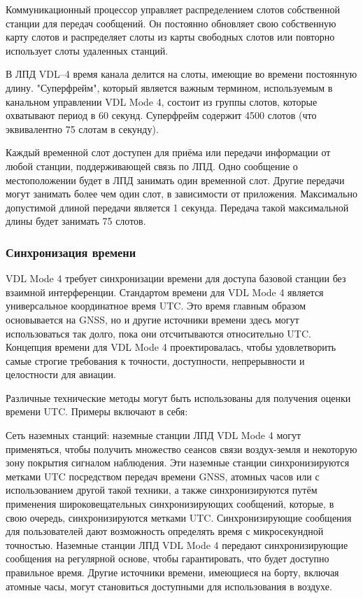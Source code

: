 \documentclass[a4paper,12pt]{report} %
\begin{document}
Коммуникационный процессор управляет распределением слотов собственной станции
для передач сообщений. Он постоянно обновляет свою собственную карту слотов и
распределяет слоты из карты свободных слотов или повторно использует слоты
удаленных станций.

В ЛПД VDL--4 время канала делится на слоты, имеющие во времени постоянную длину.
"Суперфрейм", который является важным термином, используемым в канальном
управлении VDL Mode 4, состоит из группы слотов, которые охватывают период в 60
секунд. Суперфрейм содержит 4500 слотов (что эквивалентно 75 слотам в секунду).

Каждый временной слот доступен для приёма или передачи информации от любой
станции, поддерживающей связь по ЛПД. Одно сообщение о местоположении будет в
ЛПД занимать один временной слот. Другие передачи могут занимать более чем один
слот, в зависимости от приложения. Максимально допустимой длиной передачи
является 1 секунда. Передача такой максимальной длины будет занимать 75 слотов. 

\subsubsection{Синхронизация времени}

VDL Mode 4 требует синхронизации времени для доступа базовой станции без
взаимной интерференции. Стандартом времени для VDL Mode 4 является универсальное
координатное время UTC. Это время главным образом основывается на GNSS, но и
другие источники времени здесь могут использоваться так долго, пока они
отсчитываются относительно UTC. Концепция времени для VDL Mode 4
проектировалась, чтобы удовлетворить самые строгие требования к точности,
доступности, непрерывности и целостности для авиации. 

Различные технические методы могут быть использованы для получения оценки
времени UTC. Примеры включают в себя: 

Сеть наземных станций: наземные станции ЛПД VDL Mode 4 могут применяться, чтобы
получить множество сеансов связи воздух-земля и некоторую зону покрытия сигналом
наблюдения. Эти наземные станции синхронизируются метками UTC посредством
передач времени GNSS, атомных часов или с использованием другой такой техники, а
также синхронизируются путём применения широковещательных синхронизирующих
сообщений, которые, в свою очередь, синхронизируются метками UTC.
Синхронизирующие сообщения для пользователей дают возможность определять время с
микросекундной точностью. Наземные станции ЛПД VDL Mode 4 передают
синхронизирующие сообщения на регулярной основе, чтобы гарантировать, что будет
доступно правильное время. Другие источники времени, имеющиеся на борту, включая
атомные часы, могут становиться доступными для использования в воздухе. 
\end{document}
